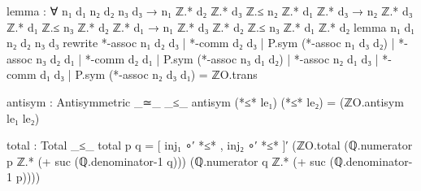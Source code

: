 \documentclass[11pt,a4paper]{article}
\begin{document}
\begin{code}
    lemma : ∀ n₁ d₁ n₂ d₂ n₃ d₃ →
            n₁ ℤ.* d₂ ℤ.* d₃ ℤ.≤ n₂ ℤ.* d₁ ℤ.* d₃ →
            n₂ ℤ.* d₃ ℤ.* d₁ ℤ.≤ n₃ ℤ.* d₂ ℤ.* d₁ →
            n₁ ℤ.* d₃ ℤ.* d₂ ℤ.≤ n₃ ℤ.* d₁ ℤ.* d₂
    lemma n₁ d₁ n₂ d₂ n₃ d₃
      rewrite *-assoc n₁ d₂ d₃
            | *-comm d₂ d₃
            | P.sym (*-assoc n₁ d₃ d₂)
            | *-assoc n₃ d₂ d₁
            | *-comm d₂ d₁
            | P.sym (*-assoc n₃ d₁ d₂)
            | *-assoc n₂ d₁ d₃
            | *-comm d₁ d₃
            | P.sym (*-assoc n₂ d₃ d₁)
            = ℤO.trans

  antisym : Antisymmetric _≃_ _≤_
  antisym (*≤* le₁) (*≤* le₂) = (ℤO.antisym le₁ le₂)

  total : Total _≤_
  total p q =
    [ inj₁ ∘′ *≤* , inj₂ ∘′ *≤* ]′
      (ℤO.total (ℚ.numerator p ℤ.* (+ suc (ℚ.denominator-1 q)))
                (ℚ.numerator q ℤ.* (+ suc (ℚ.denominator-1 p))))
\end{code}
\end{document}
